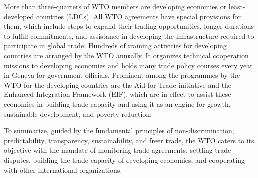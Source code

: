 More than three-quarters of WTO members are developing economies or least-developed countries (LDCs). All WTO agreements have special provisions for them, which include steps to expand their trading opportunities, longer durations to fulfill commitments, and assistance in developing the infrastructure required to participate in global trade. Hundreds of training activities for developing countries are arranged by the WTO annually. It organizes technical cooperation missions to developing economies and holds many trade policy courses every year in Geneva for government officials. Prominent among the programmes by the WTO for the developing countries are the Aid for Trade initiative and the Enhanced Integration Framework (EIF), which are in effect to assist these economies in building trade capacity and using it as an engine for growth, sustainable development, and poverty reduction.

To summarize, guided by the fundamental principles of non-discrimination, predictability, transparency, sustainability, and freer trade, the WTO caters to its objective with the mandate of monitoring trade agreements, settling trade disputes, building the trade capacity of developing economies, and cooperating with other international organizations.
